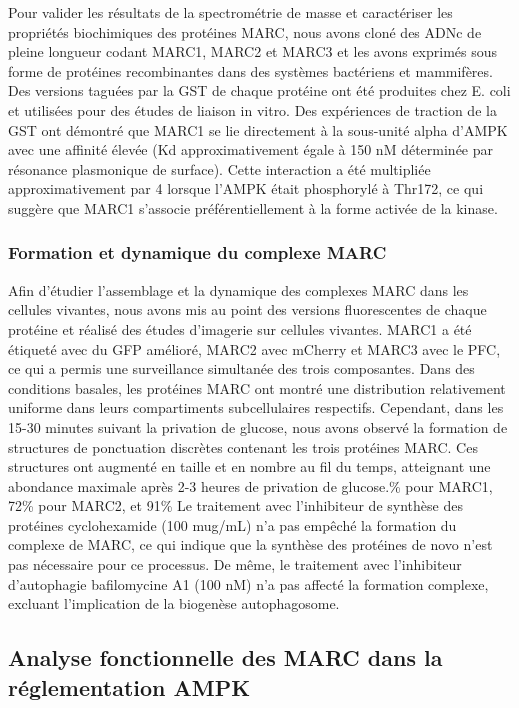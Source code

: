 \documentclass[11pt,a4paper]{article}
\begin{document}
Pour valider les résultats de la spectrométrie de masse et caractériser les propriétés biochimiques des protéines MARC, nous avons cloné des ADNc de pleine longueur codant MARC1, MARC2 et MARC3 et les avons exprimés sous forme de protéines recombinantes dans des systèmes bactériens et mammifères. Des versions taguées par la GST de chaque protéine ont été produites chez E. coli et utilisées pour des études de liaison in vitro. Des expériences de traction de la GST ont démontré que MARC1 se lie directement à la sous-unité alpha d'AMPK avec une affinité élevée (Kd approximativement égale à 150 nM déterminée par résonance plasmonique de surface). Cette interaction a été multipliée approximativement par 4 lorsque l'AMPK était phosphorylé à Thr172, ce qui suggère que MARC1 s'associe préférentiellement à la forme activée de la kinase.

\subsubsection{Formation et dynamique du complexe MARC}

Afin d'étudier l'assemblage et la dynamique des complexes MARC dans les cellules vivantes, nous avons mis au point des versions fluorescentes de chaque protéine et réalisé des études d'imagerie sur cellules vivantes. MARC1 a été étiqueté avec du GFP amélioré, MARC2 avec mCherry et MARC3 avec le PFC, ce qui a permis une surveillance simultanée des trois composantes. Dans des conditions basales, les protéines MARC ont montré une distribution relativement uniforme dans leurs compartiments subcellulaires respectifs. Cependant, dans les 15-30 minutes suivant la privation de glucose, nous avons observé la formation de structures de ponctuation discrètes contenant les trois protéines MARC. Ces structures ont augmenté en taille et en nombre au fil du temps, atteignant une abondance maximale après 2-3 heures de privation de glucose.\% pour MARC1, 72\% pour MARC2, et 91\% Le traitement avec l'inhibiteur de synthèse des protéines cyclohexamide (100 mug/mL) n'a pas empêché la formation du complexe de MARC, ce qui indique que la synthèse des protéines de novo n'est pas nécessaire pour ce processus. De même, le traitement avec l'inhibiteur d'autophagie bafilomycine A1 (100 nM) n'a pas affecté la formation complexe, excluant l'implication de la biogenèse autophagosome.

\subsection{Analyse fonctionnelle des MARC dans la réglementation AMPK}
\end{document}
